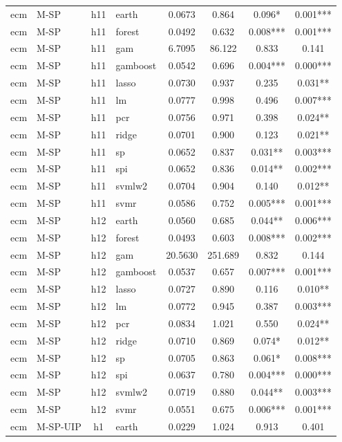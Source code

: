 \begin{ThreePartTable}
\begin{longtable}[t]{llclcccc}
\addlinespace
ecm & M-SP & h11 & earth & 0.0673 & 0.864 & 0.096* & 0.001***\\
ecm & M-SP & h11 & forest & 0.0492 & 0.632 & 0.008*** & 0.001***\\
ecm & M-SP & h11 & gam & 6.7095 & 86.122 & 0.833 & 0.141\\
ecm & M-SP & h11 & gamboost & 0.0542 & 0.696 & 0.004*** & 0.000***\\
ecm & M-SP & h11 & lasso & 0.0730 & 0.937 & 0.235 & 0.031**\\
ecm & M-SP & h11 & lm & 0.0777 & 0.998 & 0.496 & 0.007***\\
ecm & M-SP & h11 & pcr & 0.0756 & 0.971 & 0.398 & 0.024**\\
ecm & M-SP & h11 & ridge & 0.0701 & 0.900 & 0.123 & 0.021**\\
ecm & M-SP & h11 & sp & 0.0652 & 0.837 & 0.031** & 0.003***\\
ecm & M-SP & h11 & spi & 0.0652 & 0.836 & 0.014** & 0.002***\\
ecm & M-SP & h11 & svmlw2 & 0.0704 & 0.904 & 0.140 & 0.012**\\
ecm & M-SP & h11 & svmr & 0.0586 & 0.752 & 0.005*** & 0.001***\\
\addlinespace
ecm & M-SP & h12 & earth & 0.0560 & 0.685 & 0.044** & 0.006***\\
ecm & M-SP & h12 & forest & 0.0493 & 0.603 & 0.008*** & 0.002***\\
ecm & M-SP & h12 & gam & 20.5630 & 251.689 & 0.832 & 0.144\\
ecm & M-SP & h12 & gamboost & 0.0537 & 0.657 & 0.007*** & 0.001***\\
ecm & M-SP & h12 & lasso & 0.0727 & 0.890 & 0.116 & 0.010**\\
ecm & M-SP & h12 & lm & 0.0772 & 0.945 & 0.387 & 0.003***\\
ecm & M-SP & h12 & pcr & 0.0834 & 1.021 & 0.550 & 0.024**\\
ecm & M-SP & h12 & ridge & 0.0710 & 0.869 & 0.074* & 0.012**\\
ecm & M-SP & h12 & sp & 0.0705 & 0.863 & 0.061* & 0.008***\\
ecm & M-SP & h12 & spi & 0.0637 & 0.780 & 0.004*** & 0.000***\\
ecm & M-SP & h12 & svmlw2 & 0.0719 & 0.880 & 0.044** & 0.003***\\
ecm & M-SP & h12 & svmr & 0.0551 & 0.675 & 0.006*** & 0.001***\\
\addlinespace
ecm & M-SP-UIP & h1 & earth & 0.0229 & 1.024 & 0.913 & 0.401\\

\end{longtable}
\end{ThreePartTable}
